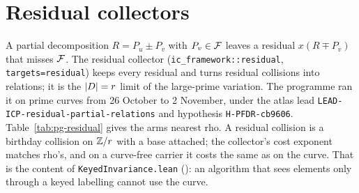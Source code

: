 \section{Residual collectors}\label{sec:pg-residual}

A partial decomposition $R=P_u\pm P_v$ with $P_v\in\mathcal{F}$ leaves a residual
$x(R\mp P_v)$ that misses $\mathcal{F}$. The residual collector
(\texttt{ic\_framework::residual}, \texttt{targets=residual}) keeps every
residual and turns residual collisions into relations; it is the
$\lvert D \rvert=r$ limit of the large-prime variation. The programme ran it on
prime curves from 26 October to 2 November, under the atlas lead
\texttt{LEAD-ICP-residual-partial-relations} and hypothesis
\texttt{H-PFDR-cb9606}. Table~\ref{tab:pg-residual} gives the arms nearest
rho. A residual collision is a birthday collision on $\mathbb{Z}/r$ with a base
attached; the collector's cost exponent matches rho's, and on a curve-free
carrier it costs the same as on the curve. That is the content of
\texttt{KeyedInvariance.lean}
(): an algorithm that
sees elements only through a keyed labelling cannot use the curve.

